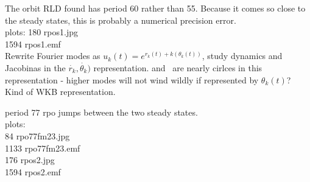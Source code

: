 The orbit RLD found has period 60 
rather than 55.  Because it comes so close to the steady states, 
this is probably a numerical precision error.
\\
plots:
 180 rpos1.jpg	\\
1594 rpos1.emf	\\


Rewrite Fourier modes as $u_k(t) = e^{r_k(t) + k(\theta_k(t))}$, study
dynamics and Jacobinas in the $\dot{r_k},\dot{\theta_k})$ representation.
 and  \eqva\ are nearly cirlces in this representation - higher
modes will not wind wildly if represented by $\theta_k(t)$? Kind of WKB
representation.

period 77 rpo jumps between the two steady states.
\\
plots:	\\
  84 rpo77fm23.jpg	\\
1133 rpo77fm23.emf	\\
 176 rpos2.jpg	\\
1594 rpos2.emf	\\

